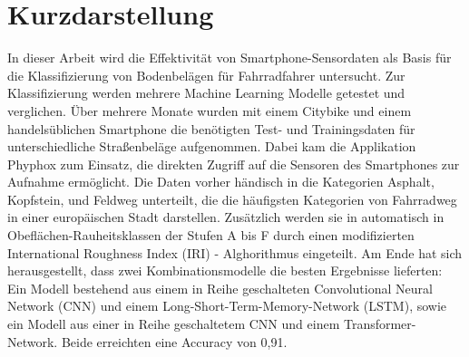 \thispagestyle{empty}
\section*{Kurzdarstellung}
\label{sec:kurzdarstellung}
In dieser Arbeit wird die Effektivität von Smartphone-Sensordaten als Basis für die Klassifizierung von Bodenbelägen für Fahrradfahrer untersucht. Zur Klassifizierung werden mehrere Machine Learning Modelle getestet und verglichen. Über mehrere Monate wurden mit einem Citybike und einem handelsüblichen Smartphone die benötigten Test- und Trainingsdaten für unterschiedliche Straßenbeläge aufgenommen. Dabei kam die Applikation Phyphox zum Einsatz, die direkten Zugriff auf die Sensoren des Smartphones zur Aufnahme ermöglicht. Die Daten vorher händisch in die Kategorien Asphalt, Kopfstein, und Feldweg unterteilt, die die häufigsten Kategorien von Fahrradweg in einer europäischen Stadt darstellen. Zusätzlich werden sie in automatisch in Obeflächen-Rauheitsklassen der Stufen A bis F durch einen modifizierten International Roughness Index (IRI) - Alghorithmus eingeteilt. Am Ende hat sich herausgestellt, dass zwei Kombinationsmodelle die besten Ergebnisse lieferten: Ein Modell bestehend aus einem in Reihe geschalteten Convolutional Neural Network (CNN) und einem Long-Short-Term-Memory-Network (LSTM), sowie ein Modell aus einer in Reihe geschaltetem CNN und einem Transformer-Network. Beide erreichten eine Accuracy von 0,91.